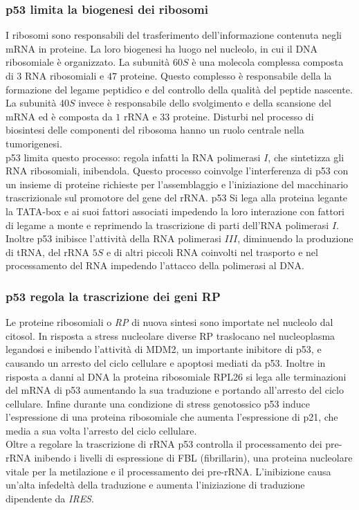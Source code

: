     \subsubsection{p53 limita la biogenesi dei ribosomi}
    I ribosomi sono responsabili del trasferimento dell'informazione contenuta negli mRNA in proteine.
    La loro biogenesi ha luogo nel nucleolo, in cui il DNA ribosomiale \`e organizzato.
    La subunit\`a $60S$ \`e una molecola complessa composta di $3$ RNA ribosomiali e $47$ proteine.
    Questo complesso \`e responsabile della la formazione del legame peptidico e del controllo della qualit\`a del peptide nascente.
    La subunit\`a $40S$ invece \`e responsabile dello svolgimento e della scansione del mRNA ed \`e composta da $1$ rRNA e $33$ proteine.
    Disturbi nel processo di biosintesi delle componenti del ribosoma hanno un ruolo centrale nella tumorigenesi.\\
    p53 limita questo processo: regola infatti la RNA polimerasi $I$, che sintetizza gli RNA ribosomiali, inibendola.
    Questo processo coinvolge l'interferenza di p53 con un insieme di proteine richieste per l'assemblaggio e l'iniziazione del macchinario trascrizionale sul promotore del gene del rRNA.
    p53 Si lega alla proteina legante la TATA-box e ai suoi fattori associati impedendo la loro interazione con fattori di legame a monte e reprimendo la trascrizione di parti dell'RNA polimerasi $I$.\\
    Inoltre p53 inibisce l'attivit\`a della RNA polimerasi $III$, diminuendo la produzione di tRNA, del rRNA $5S$ e di altri piccoli RNA coinvolti nel trasporto e nel processamento del RNA impedendo l'attacco della polimerasi al DNA.

    \subsubsection{p53 regola la trascrizione dei geni RP}
    Le proteine ribosomiali o \emph{RP} di nuova sintesi sono importate nel nucleolo dal citosol.
    In risposta a stress nucleolare diverse RP traslocano nel nucleoplasma legandosi e inibendo l'attivit\`a di MDM2, un importante inibitore di p53, e causando un arresto del ciclo cellulare e apoptosi mediati da p53.
    Inoltre in risposta a danni al DNA la proteina ribosomiale RPL26 si lega alle terminazioni del mRNA di p53 aumentando la sua traduzione e portando all'arresto del ciclo cellulare.
    Infine durante una condizione di stress genotossico p53 induce l'espressione di una proteina ribosomiale che aumenta l'espressione di p21, che media a sua volta l'arresto del ciclo cellulare.\\
    Oltre a regolare la trascrizione di rRNA p53 controlla il processamento dei pre-rRNA inibendo i livelli di espressione di FBL (fibrillarin), una proteina nucleolare vitale per la metilazione e il processamento dei pre-rRNA.
    L'inibizione causa un'alta infedelt\`a della traduzione e aumenta l'iniziazione di traduzione dipendente da \emph{IRES}.

